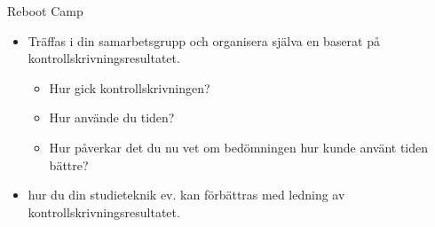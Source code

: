 \begin{Slide}{Reboot Camp}

\begin{itemize}
  \item
  Träffas i din samarbetsgrupp och organisera själva en  baserat på kontrollskrivningsresultatet.

  \begin{itemize}
    \item Hur gick kontrollskrivningen?
    \item Hur använde du tiden?
    \item Hur påverkar det du nu vet om bedömningen hur kunde använt tiden bättre?
  \end{itemize}
  
    
    \item {} hur du din studieteknik ev. kan förbättras med ledning av kontrollskrivningsresultatet.
\end{itemize}


\end{Slide}

